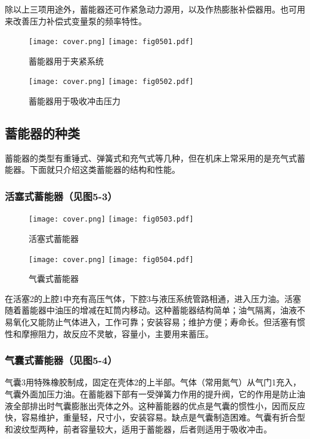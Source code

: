 除以上三项用途外，蓄能器还可作紧急动力源用，以及作热膨胀补偿器用。也可用来改善压力补偿式变量泵的频率特性。

\begin{figure}
\centering
\ifOpenSource
\texttt{[image: cover.png]}
\else
\texttt{[image: fig0501.pdf]}
\fi
\caption{蓄能器用于夹紧系统}
\label{fig:fig0501}
\end{figure}


\begin{figure}
\centering
\ifOpenSource
\texttt{[image: cover.png]}
\else
\texttt{[image: fig0502.pdf]}
\fi
\caption{蓄能器用于吸收冲击压力}
\label{fig:fig0502}
\end{figure}

\subsection{蓄能器的种类}

蓄能器的类型有重锤式、弹簧式和充气式等几种，但在机床上常采用的是充气式蓄能器。下面就只介绍这类蓄能器的结构和性能。

\subsubsection{活塞式蓄能器（见图5-3）}


\begin{figure}
\centering
\ifOpenSource
\texttt{[image: cover.png]}
\else
\texttt{[image: fig0503.pdf]}
\fi
\caption{活塞式蓄能器}
\label{fig:fig0503}
\end{figure}
\begin{figure}
\centering
\ifOpenSource
\texttt{[image: cover.png]}
\else
\texttt{[image: fig0504.pdf]}
\fi
\caption{气囊式蓄能器}
\label{fig:fig0504}
\end{figure}

在活塞2的上腔1中充有高压气体，下腔3与液压系统管路相通，进入压力油。活塞随着蓄能器中油压的增减在缸筒内移动。这种蓄能器结构简单；油气隔离，油液不易氧化又能防止气体进入，工作可靠；安装容易；维护方便；寿命长。但活塞有惯性和摩擦阻力，故反应不灵敏，容量小，主要用来蓄压。

\subsubsection{气囊式蓄能器（见图5-4）}

气囊3用特殊橡胶制成，固定在壳体2的上半部。气体（常用氮气）从气门1充入，气囊外面加压力油。在蓄能器下部有一受弹簧力作用的提升阀，它的作用是防止油液全部排出时气囊膨胀出壳体之外。这种蓄能器的优点是气囊的惯性小，因而反应快，容易维护，重量轻，尺寸小，安装容易。缺点是气囊制造困难。气囊有折合型和波纹型两种，前者容量较大，适用于蓄能器，后者则适用于吸收冲击。


